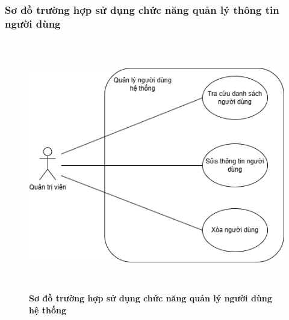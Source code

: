\subsubsection{Sơ đồ trường hợp sử dụng chức năng quản lý thông tin người dùng}

\begin{figure}[H]
	\centering
	\includegraphics[width=12cm,height=11cm]{Images/use_case/use_case_user.png}
	\caption[Sơ đồ trường hợp sử dụng chức năng quản lý người dùng]{\bfseries \fontsize{12pt}{0pt}
		\selectfont Sơ đồ trường hợp sử dụng chức năng quản lý người dùng hệ thống}
	\label{use_case_user} %
\end{figure}

